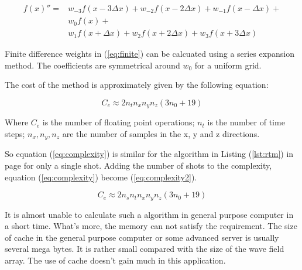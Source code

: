 \begin{equation}
  \begin{split}
    {f(x)}'' =
    & w_{-3}f\left( x - 3 \Delta x \right) +
      w_{-2}f\left( x - 2 \Delta x \right) +
      w_{-1}f\left( x - \Delta x   \right) + \\
    & w_{0}f\left( x \right) + \\
    & w_{1}f\left( x + \Delta x \right) +
      w_{2}f\left( x + 2 \Delta x \right) +
      w_{3}f\left( x + 3 \Delta x \right)
  \end{split}
  \label{eq:finite}
\end{equation}

Finite difference weights in (\ref{eq:finite}) can be calcuated using a
series expansion method. The coefficients are symmetrical around \( w_0 \)
for a uniform grid.

The cost of the method is approximately given by the following equation:

\begin{equation}
  C_e \approx 2n_t n_x n_y n_z \left( 3n_0 + 19 \right)
  \label{eq:complexity}
\end{equation}

Where \( C_e \) is the number of floating point operations; \( n_t \) is
the number of time steps; \( n_x , n_y , n_z \) are the number of samples
in the x, y and z directions.

So equation (\ref{eq:complexity}) is similar for the algorithm in Listing
(\ref{lst:rtm}) in page \pageref{lst:rtm} for only a single shot. Adding
the number of shots to the complexity, equation (\ref{eq:complexity})
become (\ref{eq:complexity2}).

\begin{equation}
  C_e \approx 2n_s n_t n_x n_y n_z \left( 3n_0 + 19 \right)
  \label{eq:complexity2}
\end{equation}

It is almost unable to calculate such a algorithm in general purpose 
computer in a short time. What's more, the memory can not satisfy the 
requirement. The size of cache in the general purpose computer or some advanced 
server is usually several mega bytes. It is rather small compared with the 
size of the wave field array. The use of cache doesn't gain much in this 
application.
